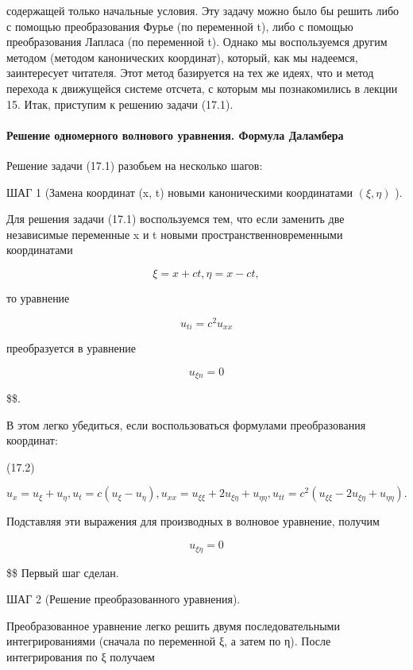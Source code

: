 \documentclass[
  ukrainian,
]{article}
\begin{document}
содержащей только начальные условия. Эту задачу можно было бы решить
либо с помощью преобразования Фурье (по переменной t), либо с помощью
преобразования Лапласа (по переменной t). Однако мы воспользуемся другим
методом (методом канонических координат), который, как мы надеемся,
заинтересует читателя. Этот метод базируется на тех же идеях, что и
метод перехода к движущейся системе отсчета, с которым мы познакомились
в лекции 15. Итак, приступим к решению задачи (17.1).

\paragraph{Решение одномерного волнового уравнения. Формула
Даламбера}\label{ux440ux435ux448ux435ux43dux438ux435-ux43eux434ux43dux43eux43cux435ux440ux43dux43eux433ux43e-ux432ux43eux43bux43dux43eux432ux43eux433ux43e-ux443ux440ux430ux432ux43dux435ux43dux438ux44f.-ux444ux43eux440ux43cux443ux43bux430-ux434ux430ux43bux430ux43cux431ux435ux440ux430}

Решение задачи (17.1) разобьем на несколько шагов:

ШАГ 1 (Замена координат (x, t) новыми каноническими координатами
\((\xi, \eta)\) ).

Для решения задачи (17.1) воспользуемся тем, что если заменить две
независимые переменные x и t новыми пространственновременными
координатами

\[
\xi = x + ct,
\eta = x - ct,
\]

то уравнение

\[
u_{ti} = c^2 u_{xx}
\]

преобразуется в уравнение

\[
u_{\xi n} = 0
\]

\$\$.

В этом легко убедиться, если воспользоваться формулами преобразования
координат:

(17.2)

\[
u_{x} = u_{\xi} + u_{\eta}, u_{t} = c (u_{\xi} - u_{\eta}), u_{xx} = u_{\xi\xi} + 2u_{\xi\eta} + u_{\eta\eta}, u_{tt} = c^{2} (u_{\xi\xi} - 2u_{\xi\eta} + u_{\eta\eta}).
\]

Подставляя эти выражения для производных в волновое уравнение, получим

\[
u_{\xi\eta} = 0
\]

\$\$ Первый шаг сделан.

ШАГ 2 (Решение преобразованного уравнения).

Преобразованное уравнение легко решить двумя последовательными
интегрированиями (сначала по переменной ξ, а затем по η). После
интегрирования по ξ получаем
\end{document}
